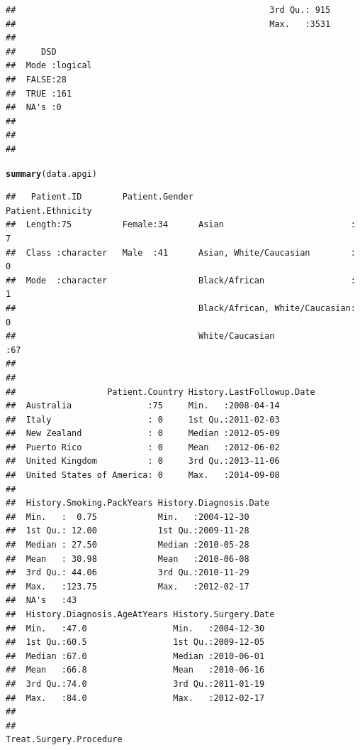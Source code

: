 \documentclass{article}\usepackage[]{graphicx}\usepackage[]{color}
\makeatletter
\newcommand{\hlstd}[1]{\textcolor[rgb]{0.345,0.345,0.345}{#1}}%
\newcommand{\hlkwd}[1]{\textcolor[rgb]{0.737,0.353,0.396}{\textbf{#1}}}%
\newenvironment{kframe}{%
 \def\at@end@of@kframe{}%
 \ifinner\ifhmode%
  \def\at@end@of@kframe{\end{minipage}}%
  \begin{minipage}{\columnwidth}%
 \fi\fi%
 \def\FrameCommand##1{\hskip\@totalleftmargin \hskip-\fboxsep
 \colorbox{shadecolor}{##1}\hskip-\fboxsep
     \hskip-\linewidth \hskip-\@totalleftmargin \hskip\columnwidth}%
 \MakeFramed {\advance\hsize-\width
   \@totalleftmargin\z@ \linewidth\hsize
   \@setminipage}}%
 {\par\unskip\endMakeFramed%
 \at@end@of@kframe}
\newenvironment{knitrout}{}{} %
\makeatother
\begin{document}
\begin{knitrout}
\begin{kframe}
\begin{verbatim}
##                                                  3rd Qu.: 915  
##                                                  Max.   :3531  
##                                                                
##     DSD         
##  Mode :logical  
##  FALSE:28       
##  TRUE :161      
##  NA's :0        
##                 
##                 
## 
\end{verbatim}
\begin{alltt}
\hlkwd{summary}\hlstd{(data.apgi)}
\end{alltt}
\begin{verbatim}
##   Patient.ID        Patient.Gender                      Patient.Ethnicity
##  Length:75          Female:34      Asian                         : 7     
##  Class :character   Male  :41      Asian, White/Caucasian        : 0     
##  Mode  :character                  Black/African                 : 1     
##                                    Black/African, White/Caucasian: 0     
##                                    White/Caucasian               :67     
##                                                                          
##                                                                          
##                  Patient.Country History.LastFollowup.Date
##  Australia               :75     Min.   :2008-04-14       
##  Italy                   : 0     1st Qu.:2011-02-03       
##  New Zealand             : 0     Median :2012-05-09       
##  Puerto Rico             : 0     Mean   :2012-06-02       
##  United Kingdom          : 0     3rd Qu.:2013-11-06       
##  United States of America: 0     Max.   :2014-09-08       
##                                                           
##  History.Smoking.PackYears History.Diagnosis.Date
##  Min.   :  0.75            Min.   :2004-12-30    
##  1st Qu.: 12.00            1st Qu.:2009-11-28    
##  Median : 27.50            Median :2010-05-28    
##  Mean   : 30.98            Mean   :2010-06-08    
##  3rd Qu.: 44.06            3rd Qu.:2010-11-29    
##  Max.   :123.75            Max.   :2012-02-17    
##  NA's   :43                                      
##  History.Diagnosis.AgeAtYears History.Surgery.Date
##  Min.   :47.0                 Min.   :2004-12-30  
##  1st Qu.:60.5                 1st Qu.:2009-12-05  
##  Median :67.0                 Median :2010-06-01  
##  Mean   :66.8                 Mean   :2010-06-16  
##  3rd Qu.:74.0                 3rd Qu.:2011-01-19  
##  Max.   :84.0                 Max.   :2012-02-17  
##                                                   
##                                                                 Treat.Surgery.Procedure

\end{verbatim}
\end{kframe}
\end{knitrout}
\end{document}
